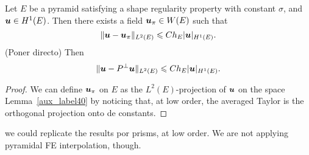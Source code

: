 \begin{proposition}\label{propupi}
Let $E$ be a pyramid satisfying a shape regularity property with constant $\sigma$, and $\boldsymbol{u}\in H^1(E)$. 
Then there exists a field $\boldsymbol{u}_\pi\in W(E)$ such that
\[
\|\boldsymbol{u}-\boldsymbol{u}_\pi\|_{L^2(E)}\leqslant C h_E|\boldsymbol{u}|_{H^1(E)}.
\]
(Poner directo) Then
\[
\|\boldsymbol{u}-P^{\perp}\boldsymbol{u}\|_{L^2(E)}\leqslant C h_E|\boldsymbol{u}|_{H^1(E)}.
\]
\end{proposition}
\begin{proof}
We can define $\boldsymbol{u}_\pi$ on $E$ as the $L^2(E)$-projection of $\boldsymbol{u}$ on the space
Lemma~\ref{aux_label40}	
by noticing that, at low order, the averaged Taylor is the orthogonal projection
onto de constants.
\end{proof}
\begin{remark}
  we could replicate the results por prisms, at low order. We are not
  applying pyramidal FE interpolation, though.
\end{remark}